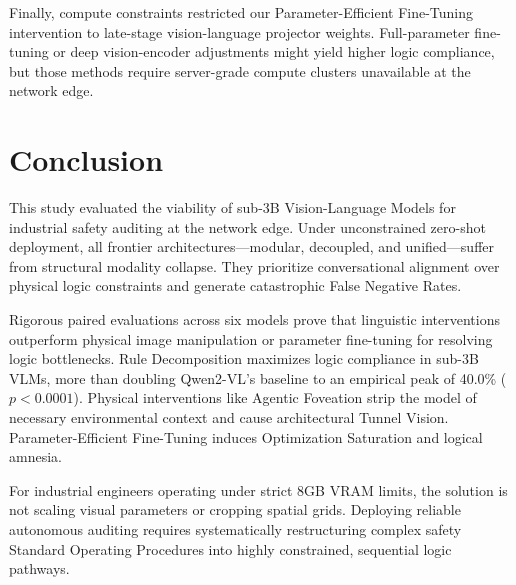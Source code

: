 \documentclass{article}
\begin{document}
Finally, compute constraints restricted our Parameter-Efficient Fine-Tuning intervention to late-stage vision-language projector weights. Full-parameter fine-tuning or deep vision-encoder adjustments might yield higher logic compliance, but those methods require server-grade compute clusters unavailable at the network edge.

\section*{Conclusion}


This study evaluated the viability of sub-3B Vision-Language Models for industrial safety auditing at the network edge. Under unconstrained zero-shot deployment, all frontier architectures—modular, decoupled, and unified—suffer from structural modality collapse. They prioritize conversational alignment over physical logic constraints and generate catastrophic False Negative Rates. 

Rigorous paired evaluations across six models prove that linguistic interventions outperform physical image manipulation or parameter fine-tuning for resolving logic bottlenecks. Rule Decomposition maximizes logic compliance in sub-3B VLMs, more than doubling Qwen2-VL's baseline to an empirical peak of 40.0\% ($p < 0.0001$). Physical interventions like Agentic Foveation strip the model of necessary environmental context and cause architectural Tunnel Vision. Parameter-Efficient Fine-Tuning induces Optimization Saturation and logical amnesia.

For industrial engineers operating under strict 8GB VRAM limits, the solution is not scaling visual parameters or cropping spatial grids. Deploying reliable autonomous auditing requires systematically restructuring complex safety Standard Operating Procedures into highly constrained, sequential logic pathways.
\end{document}
